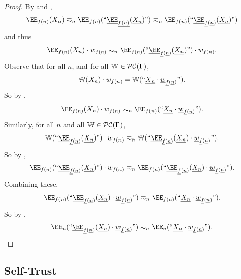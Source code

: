 \documentclass[authordate,onecolumn,noenvironments]{miri-tech-article}
\numberwithin{equation}{subsection}
\newcommand{\quot}[1]{``#1"}
\newcommand{\enc}[1]{{\underline{#1}}}
\newcommand{\fuz}{w}
\newcommand{\cworlds}{\mathcal{P\-C}} %
\newcommand{\World}{\mathbb{W}}
\newcommand{\Theory}{\Gamma}
\begin{document}
\begin{proof}

  By  and ,
  \[ \EE_{f(n)}(X_n) \eqsim_n \EE_{f(n)}( \quot{ \enc{\EE}_{\enc{f(n) }} (\enc{X_n})} ) \eqsim_n \EE_{f(n)}( \quot{ \enc{\EE}_{\enc{f}(\enc{n}) } (\enc{X_n})}  ) \]
  and thus
  \[ \EE_{f(n)}(X_n) \cdot \fuz_{f(n)} \eqsim_n \EE_{f(n)}( \quot{ \enc{\EE}_{\enc{f}(\enc{n}) } (\enc{X_n})}  ) \cdot \fuz_{f(n)}. \]
  Observe that for all $n$, and for all $\World \in \cworlds(\Theory)$, 
  \[
    \World(X_n) \cdot \fuz_{f(n)} =  \World(\quot{ \enc{X_n} \cdot \enc{\fuz}_{ \enc{f}(\enc{n} )} }).
  \]
  So by ,
  \[
  \EE_{f(n)}(X_n) \cdot \fuz_{f(n)}   
  \eqsim_n
  \EE_{f(n)}(\quot{ \enc{X_n} \cdot \enc{\fuz}_{ \enc{f}(\enc{n} )} }).
  \]
  Similarly, for all $n$ and all $\World \in \cworlds(\Theory)$,
  \[
    \World( \quot{ \enc{\EE}_{\enc{f}(\enc{n}) } (\enc{X_n})}) \cdot \fuz_{f(n)} \eqsim_n
    \World( \quot{ \enc{\EE}_{\enc{f}(\enc{n}) } (\enc{X_n}) \cdot \enc{\fuz}_{\enc{f}(\enc{n})} } ).
  \]
  So by ,
  \[
    \EE_{f(n)}( \quot{ \enc{\EE}_{\enc{f}(\enc{n}) } (\enc{X_n})}) \cdot \fuz_{f(n)} \eqsim_n
    \EE_{f(n)}( \quot{ \enc{\EE}_{\enc{f}(\enc{n}) } (\enc{X_n}) \cdot \enc{\fuz}_{\enc{f}(\enc{n})} } ).
  \]
  Combining these,
  \[
    \EE_{f(n)}( \quot{ \enc{\EE}_{\enc{f}(\enc{n}) } (\enc{X_n}) \cdot \enc{\fuz}_{\enc{f}(\enc{n})}}  )
    \eqsim_n
    \EE_{f(n)}(\quot{ \enc{X_n} \cdot \enc{\fuz}_{ \enc{f}(\enc{n} )} }).
  \]
  So by ,
  \[
    \EE_{n}( \quot{ \enc{\EE}_{\enc{f}(\enc{n}) } (\enc{X_n}) \cdot \enc{\fuz}_{\enc{f}(\enc{n})} } )
    \eqsim_n
    \EE_{n}(\quot{ \enc{X_n} \cdot \enc{\fuz}_{ \enc{f}(\enc{n} )} }).
  \]
\end{proof}

\subsection{Self-Trust}\label{app:st}

\restatest*
\end{document}
